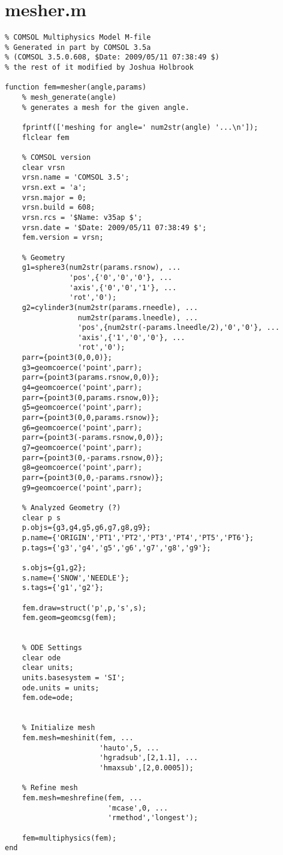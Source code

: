 \section{mesher.m}
\small
\begin{verbatim}
% COMSOL Multiphysics Model M-file
% Generated in part by COMSOL 3.5a 
% (COMSOL 3.5.0.608, $Date: 2009/05/11 07:38:49 $)
% the rest of it modified by Joshua Holbrook

function fem=mesher(angle,params)
    % mesh_generate(angle)
    % generates a mesh for the given angle. 

    fprintf(['meshing for angle=' num2str(angle) '...\n']);
    flclear fem

    % COMSOL version
    clear vrsn
    vrsn.name = 'COMSOL 3.5';
    vrsn.ext = 'a';
    vrsn.major = 0;
    vrsn.build = 608;
    vrsn.rcs = '$Name: v35ap $';
    vrsn.date = '$Date: 2009/05/11 07:38:49 $';
    fem.version = vrsn;

    % Geometry
    g1=sphere3(num2str(params.rsnow), ...
               'pos',{'0','0','0'}, ...
               'axis',{'0','0','1'}, ...
               'rot','0');
    g2=cylinder3(num2str(params.rneedle), ...
                 num2str(params.lneedle), ...
                 'pos',{num2str(-params.lneedle/2),'0','0'}, ...
                 'axis',{'1','0','0'}, ...
                 'rot','0');
    parr={point3(0,0,0)};
    g3=geomcoerce('point',parr);
    parr={point3(params.rsnow,0,0)};
    g4=geomcoerce('point',parr);
    parr={point3(0,params.rsnow,0)};
    g5=geomcoerce('point',parr);
    parr={point3(0,0,params.rsnow)};
    g6=geomcoerce('point',parr);
    parr={point3(-params.rsnow,0,0)};
    g7=geomcoerce('point',parr);
    parr={point3(0,-params.rsnow,0)};
    g8=geomcoerce('point',parr);
    parr={point3(0,0,-params.rsnow)};
    g9=geomcoerce('point',parr);

    % Analyzed Geometry (?)
    clear p s
    p.objs={g3,g4,g5,g6,g7,g8,g9};
    p.name={'ORIGIN','PT1','PT2','PT3','PT4','PT5','PT6'};
    p.tags={'g3','g4','g5','g6','g7','g8','g9'};

    s.objs={g1,g2};
    s.name={'SNOW','NEEDLE'};
    s.tags={'g1','g2'};

    fem.draw=struct('p',p,'s',s);
    fem.geom=geomcsg(fem);


    % ODE Settings
    clear ode
    clear units;
    units.basesystem = 'SI';
    ode.units = units;
    fem.ode=ode;


    % Initialize mesh
    fem.mesh=meshinit(fem, ...
                      'hauto',5, ...
                      'hgradsub',[2,1.1], ...
                      'hmaxsub',[2,0.0005]);

    % Refine mesh
    fem.mesh=meshrefine(fem, ...
                        'mcase',0, ...
                        'rmethod','longest');

    fem=multiphysics(fem);
end
\end{verbatim}
\normalsize

